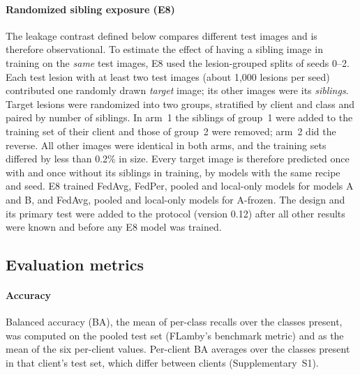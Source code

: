 \documentclass[VANCOUVER,Times1COL]{WileyNJDv5}
\begin{document}
\paragraph{Randomized sibling exposure (E8)} The leakage contrast defined below compares different test
images and is therefore observational. To estimate the effect of having a sibling image in training on
the \emph{same} test images, E8 used the lesion-grouped splits of seeds 0--2. Each test lesion with at
least two test images (about 1,000 lesions per seed) contributed one randomly drawn \emph{target} image;
its other images were its \emph{siblings}. Target lesions were randomized into two groups, stratified by
client and class and paired by number of siblings. In arm~1 the siblings of group~1 were added to the
training set of their client and those of group~2 were removed; arm~2 did the reverse. All other images
were identical in both arms, and the training sets differed by less than 0.2\% in size. Every target image
is therefore predicted once with and once without its siblings in training, by models with the same
recipe and seed. E8 trained FedAvg, FedPer, pooled and local-only models for models A and B, and FedAvg,
pooled and local-only models for A-frozen. The design and its primary test were added to the protocol
(version 0.12) after all other results were known and before any E8 model was trained.

\subsection{Evaluation metrics}
\label{sec:metrics}

\paragraph{Accuracy} Balanced accuracy (BA), the mean of per-class recalls over the classes present, was
computed on the pooled test set (FLamby's benchmark metric) and as the mean of the six per-client values.
Per-client BA averages over the classes present in that client's test set, which differ between clients
(Supplementary~S1).
\end{document}

